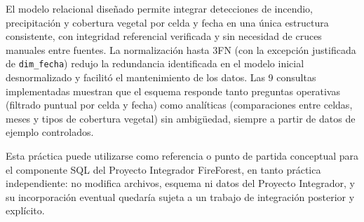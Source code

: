 \documentclass[11pt,a4paper]{article}
\begin{document}
El modelo relacional dise\~nado permite integrar detecciones de incendio, precipitaci\'on y
cobertura vegetal por celda y fecha en una \'unica estructura consistente, con integridad
referencial verificada y sin necesidad de cruces manuales entre fuentes. La normalizaci\'on hasta
3FN (con la excepci\'on justificada de \texttt{dim\_fecha}) redujo la redundancia identificada en
el modelo inicial desnormalizado y facilit\'o el mantenimiento de los datos. Las 9 consultas
implementadas muestran que el esquema responde tanto preguntas operativas (filtrado puntual por
celda y fecha) como anal\'iticas (comparaciones entre celdas, meses y tipos de cobertura vegetal)
sin ambig\"uedad, siempre a partir de datos de ejemplo controlados.

Esta pr\'actica puede utilizarse como referencia o punto de partida conceptual para el componente
SQL del Proyecto Integrador FireForest, en tanto pr\'actica independiente: no modifica archivos,
esquema ni datos del Proyecto Integrador, y su incorporaci\'on eventual quedar\'ia sujeta a un
trabajo de integraci\'on posterior y expl\'icito.
\end{document}
